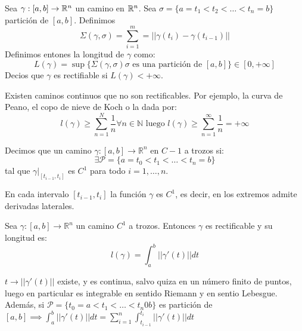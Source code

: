 \begin{definición}
    Sea $\gamma: [a,b] \to \mathbb{R}^n$ un camino en $\mathbb{R}^n$. Sea $\sigma = \{a = t_1 < t_2 < \ldots < t_n = b\}$ partición de $[a,b]$. Definimos $$\Sigma(\gamma, \sigma) = \sum_{i = 1}^{m} = ||\gamma(t_i) - \gamma(t_{i-1})||$$
    Definimos entones la longitud de $\gamma$ como: $$L(\gamma) = \sup\{\Sigma(\gamma, \sigma)  \sigma \text{ es una partición de } [a, b]\} \in [0, + \infty]$$
    Decios que $\gamma$ es rectifiable si $L(\gamma) < + \infty$.
\end{definición}

\begin{observación}
    Existen caminos continuos que no son rectificables. Por ejemplo, la curva de Peano, el copo de nieve de Koch o la dada por: 
    $$l(\gamma) \geq \sum_{n = 1}^{N}\frac{1}{n} \forall n \in \mathbb{N} \text{ luego } l(\gamma) \geq \sum_{n = 1}^{\infty}\frac{1}{n} = + \infty$$
\end{observación}

\begin{definición}
    Decimos que un camino $\gamma: [a, b] \to \mathbb{R}^n$ en $C-1$ a trozos si: 
    $$\exists \mathcal{P} = \{a = t_0 < t_1 < \ldots < t_n = b\}$$ tal que $\gamma|_{[t_{i-1}, t_i]}$ es $C^1$ para todo $i = 1, \ldots, n$.
\end{definición}

\begin{observación}
    En cada intervalo $[t_{i-1}, t_i]$ la función $\gamma$ es $C^1$, es decir, en los extremos admite derivadas laterales. 
\end{observación}

\begin{teorema}
    Sea $\gamma: [a, b] \to \mathbb{R}^n$ un camino $C^1$ a trozos. Entonces $\gamma$ es rectificable y su longitud es:
    $$l(\gamma) = \int_{a}^{b}||\gamma'(t)||dt$$	
\end{teorema}

\begin{observación}
    $t \to ||\gamma'(t)||$ existe, y es continua, salvo quiza en un número finito de puntos, luego en particular es integrable en sentido Riemann y en sentio Lebesgue.
    \\Además, si $\mathcal{P} = \{t_0 = a < t_1 < \ldots < t_n 0 b\}$ es partición de $[a,b] \implies \int_{a}^{b} ||\gamma'(t)||dt = \sum_{i = 1}^{n} \int_{t_{i-1}}^{t_i}||\gamma'(t)||dt$
\end{observación}

